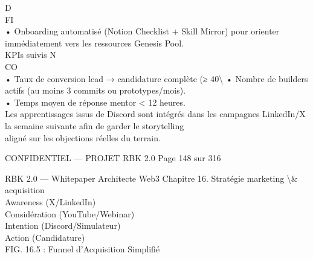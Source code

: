 \vspace{0.5em}
D\\
FI\\
• Onboarding automatisé (Notion Checklist + Skill Mirror) pour orienter immédiatement vers les ressources Genesis Pool.\\
\vspace{0.5em}
KPIs suivis                                       N\\
CO\\
• Taux de conversion lead → candidature complète (≥ 40\textbackslash{}%
\vspace{0.5em}
• Nombre de builders actifs (au moins 3 commits ou prototypes/mois).\\
\vspace{0.5em}
• Temps moyen de réponse mentor \textless{} 12 heures.\\
\vspace{0.5em}
Les apprentissages issus de Discord sont intégrés dans les campagnes LinkedIn/X la semaine suivante afin de garder le storytelling\\
aligné sur les objections réelles du terrain.\\
\vspace{0.5em}
\vspace{0.5em}
\vspace{0.5em}
\vspace{0.5em}
\begin{confidential}CONFIDENTIEL — PROJET RBK 2.0                                 Page 148 sur 316\end{confidential}
RBK 2.0 — Whitepaper Architecte Web3                                                         Chapitre 16. Stratégie marketing \textbackslash{}& acquisition\\
\vspace{0.5em}
\vspace{0.5em}
Awareness (X/LinkedIn)\\
\vspace{0.5em}
Considération (YouTube/Webinar)\\
\vspace{0.5em}
Intention (Discord/Simulateur)\\
\vspace{0.5em}
Action (Candidature)\\
\vspace{0.5em}
FIG. 16.5 : Funnel d’Acquisition Simplifié\\
\vspace{0.5em}
\vspace{0.5em}
\vspace{0.5em}
